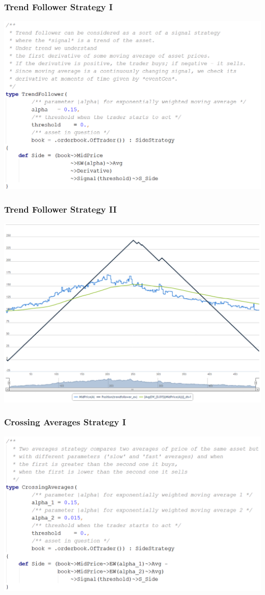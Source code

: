 \documentclass{beamer}
\begin{document}
\begin{frame}
\frametitle{Trend Follower Strategy I}
\includegraphics[width=1\linewidth]{trendfollower_strategy.png}
\end{frame}
\begin{frame}
\frametitle{Trend Follower Strategy II}
\includegraphics[width=1\linewidth]{trendfollower.png}
\end{frame}
\begin{frame}
\frametitle{Crossing Averages Strategy I}
\includegraphics[width=1\linewidth]{twoaverages_strategy.png}
\end{frame}
\end{document}
